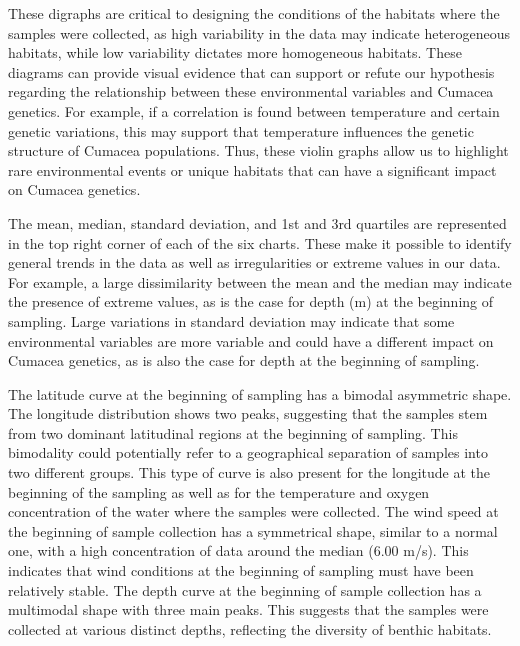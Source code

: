 These digraphs are critical to designing the conditions of the habitats where the samples were collected, as high variability in the data may indicate heterogeneous habitats, while low variability dictates more homogeneous habitats. These diagrams can provide visual evidence that can support or refute our hypothesis regarding the relationship between these environmental variables and Cumacea genetics. For example, if a correlation is found between temperature and certain genetic variations, this may support that temperature influences the genetic structure of Cumacea populations. Thus, these violin graphs allow us to highlight rare environmental events or unique habitats that can have a significant impact on Cumacea genetics. 

The mean, median, standard deviation, and 1st and 3rd quartiles are represented in the top right corner of each of the six charts. These make it possible to identify general trends in the data as well as irregularities or extreme values in our data. For example, a large dissimilarity between the mean and the median may indicate the presence of extreme values, as is the case for depth (m) at the beginning of sampling. Large variations in standard deviation may indicate that some environmental variables are more variable and could have a different impact on Cumacea genetics, as is also the case for depth at the beginning of sampling. 

The latitude curve at the beginning of sampling has a bimodal asymmetric shape. The longitude distribution shows two peaks, suggesting that the samples stem from two dominant latitudinal regions at the beginning of sampling. This bimodality could potentially refer to a geographical separation of samples into two different groups. This type of curve is also present for the longitude at the beginning of the sampling as well as for the temperature and oxygen concentration of the water where the samples were collected. The wind speed at the beginning of sample collection has a symmetrical shape, similar to a normal one, with a high concentration of data around the median (6.00 m/s). This indicates that wind conditions at the beginning of sampling must have been relatively stable. The depth curve at the beginning of sample collection has a multimodal shape with three main peaks. This suggests that the samples were collected at various distinct depths, reflecting the diversity of benthic habitats.

